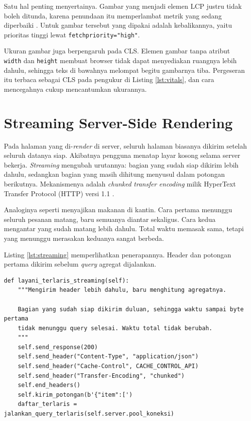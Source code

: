 Satu hal penting menyertainya. Gambar yang menjadi elemen LCP justru tidak
boleh ditunda, karena penundaan itu memperlambat metrik yang sedang
diperbaiki \cite{webdev-vitals}. Untuk gambar tersebut yang dipakai adalah
kebalikannya, yaitu prioritas tinggi lewat \texttt{fetchpriority="high"}.

Ukuran gambar juga berpengaruh pada CLS. Elemen gambar tanpa atribut
\texttt{width} dan \texttt{height} membuat browser tidak dapat menyediakan
ruangnya lebih dahulu, sehingga teks di bawahnya melompat begitu gambarnya
tiba. Pergeseran itu terbaca sebagai CLS pada pengukur di Listing
\ref{lst:vitals}, dan cara mencegahnya cukup mencantumkan ukurannya.

\section{Streaming Server-Side Rendering}

Pada halaman yang di-\textit{render} di server, seluruh halaman biasanya dikirim setelah
seluruh datanya siap. Akibatnya pengguna menatap layar kosong selama server
bekerja. \textit{Streaming} mengubah urutannya: bagian yang sudah siap
dikirim lebih dahulu, sedangkan bagian yang masih dihitung menyusul dalam
potongan berikutnya. Mekanismenya adalah \textit{chunked transfer encoding}
milik HyperText Transfer Protocol (HTTP) versi 1.1 \cite{rfc9112}.

Analoginya seperti menyajikan makanan di kantin. Cara pertama menunggu seluruh
pesanan matang, baru semuanya diantar sekaligus. Cara kedua mengantar yang
sudah matang lebih dahulu. Total waktu memasak sama, tetapi yang menunggu
merasakan keduanya sangat berbeda.

Listing \ref{lst:streaming} memperlihatkan penerapannya. Header dan potongan
pertama dikirim sebelum \textit{query} agregat dijalankan.

\begin{lstlisting}[style=PythonStyle, caption={Mengirim header lebih dahulu, baru menghitung, tersedia di \berkas{sources/chapter05/aplikasi.py}}, label={lst:streaming}]
  def layani_terlaris_streaming(self):
    """Mengirim header lebih dahulu, baru menghitung agregatnya.

    Bagian yang sudah siap dikirim duluan, sehingga waktu sampai byte pertama
    tidak menunggu query selesai. Waktu total tidak berubah.
    """
    self.send_response(200)
    self.send_header("Content-Type", "application/json")
    self.send_header("Cache-Control", CACHE_CONTROL_API)
    self.send_header("Transfer-Encoding", "chunked")
    self.end_headers()
    self.kirim_potongan(b'{"item":[')
    daftar_terlaris = jalankan_query_terlaris(self.server.pool_koneksi)
\end{lstlisting}

